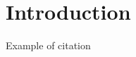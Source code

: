 
\chapter{Introduction}
\label{Introduction}
\thispagestyle{empty}

\vspace{2cm}

Example of citation \cite{FIPS197}


